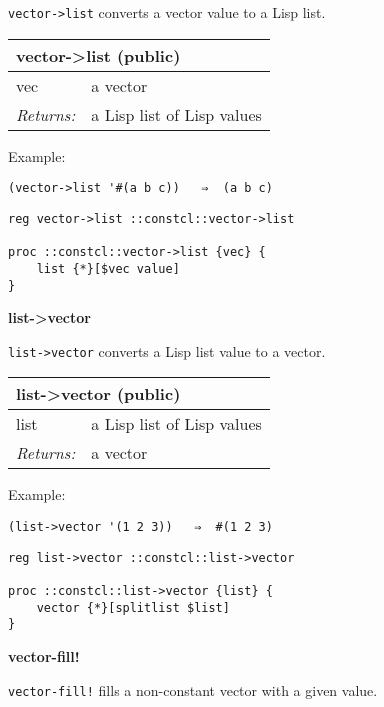 \documentclass{report}
\begin{document}
\texttt{vector->list} converts a vector value to a Lisp list.

\begin{tabular}{ |l l| }
\hline
\multicolumn{2}{|l|}{vector->list (public)} \\
\hline
vec & a vector \\
\textit{Returns:} & a Lisp list of Lisp values \\
\hline
\end{tabular}


Example:

\noindent\makebox[\linewidth]{\rule{\linewidth}{0.4pt}}
\begin{lstlisting}
(vector->list '#(a b c))   ⇒  (a b c)
\end{lstlisting}
\noindent\makebox[\linewidth]{\rule{\linewidth}{0.4pt}}
\noindent\makebox[\linewidth]{\rule{\linewidth}{0.4pt}}
\begin{lstlisting}
reg vector->list ::constcl::vector->list
 
proc ::constcl::vector->list {vec} {
    list {*}[$vec value]
}
\end{lstlisting}
\noindent\makebox[\linewidth]{\rule{\linewidth}{0.4pt}}

\textbf{list->vector}


\texttt{list->vector} converts a Lisp list value to a vector.

\begin{tabular}{ |l l| }
\hline
\multicolumn{2}{|l|}{list->vector (public)} \\
\hline
list & a Lisp list of Lisp values \\
\textit{Returns:} & a vector \\
\hline
\end{tabular}


Example:

\noindent\makebox[\linewidth]{\rule{\linewidth}{0.4pt}}
\begin{lstlisting}
(list->vector '(1 2 3))   ⇒  #(1 2 3)
\end{lstlisting}
\noindent\makebox[\linewidth]{\rule{\linewidth}{0.4pt}}
\noindent\makebox[\linewidth]{\rule{\linewidth}{0.4pt}}
\begin{lstlisting}
reg list->vector ::constcl::list->vector
 
proc ::constcl::list->vector {list} {
    vector {*}[splitlist $list]
}
\end{lstlisting}
\noindent\makebox[\linewidth]{\rule{\linewidth}{0.4pt}}

\textbf{vector-fill!}


\texttt{vector-fill!} fills a non-constant vector with a given value.
\end{document}
